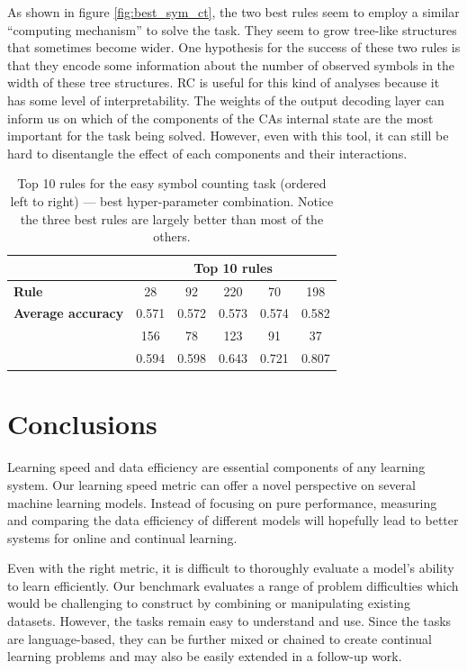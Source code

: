 As shown in figure \ref{fig:best_sym_ct}, the two best rules seem to employ a
similar ``computing mechanism'' to solve the task. They seem to grow tree-like
structures that sometimes become wider. One hypothesis for the success of these
two rules is that they encode some information about the number of observed
symbols in the width of these tree structures. \ac{RC} is useful for this kind
of analyses because it has some level of interpretability. The weights of the
output decoding layer can inform us on which of the components of the \acp{CA}
internal state are the most important for the task being solved. However, even
with this tool, it can still be hard to disentangle the effect of each
components and their interactions.

\begin{table}[htbp]
  \centering
    \begin{tabular}{p{4cm}ccccc}
      \toprule
      & \multicolumn{5}{c}{\bfseries Top 10 rules}\\
      \midrule
      \bfseries Rule & 28 & 92 & 220 & 70 & 198\\
      \bfseries Average accuracy & 0.571 & 0.572 & 0.573 & 0.574 & 0.582 \\
      \midrule
      \hrulefill & 156 & 78 & 123 & 91 & 37\\
      \hrulefill & 0.594 & 0.598 & 0.643 & 0.721 & 0.807\\
      \bottomrule
    \end{tabular}
  \caption{Top 10 rules for the easy symbol counting task (ordered left to
    right) --- best hyper-parameter combination. Notice the three best rules are
    largely better than most of the others.}\label{tab:top_sym_ct_rules}
\end{table}


\section{Conclusions}

Learning speed and data efficiency are essential components of any learning
system. Our learning speed metric can offer a novel perspective on several
machine learning models. Instead of focusing on pure performance, measuring and
comparing the data efficiency of different models will hopefully lead to better
systems for online and continual learning.


Even with the right metric, it is difficult to thoroughly evaluate a model's
ability to learn efficiently. Our benchmark evaluates a range of problem
difficulties which would be challenging to construct by combining or
manipulating existing datasets. However, the tasks remain easy to understand and
use. Since the tasks are language-based, they can be further mixed or chained to
create continual learning problems and may also be easily extended in a
follow-up work.

